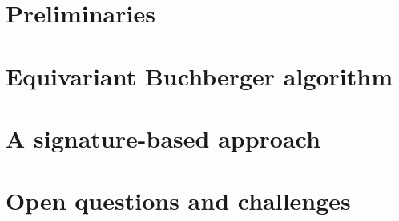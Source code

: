 \documentclass[]{aspm}
\begin{document}
\section{Preliminaries}\label{prelim}



\section{Equivariant Buchberger algorithm}\label{EGB}



\section{A signature-based approach}\label{sec:signature}



\section{Open questions and challenges}\label{sec:challenges}






\end{document}
